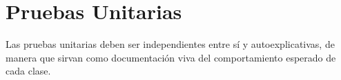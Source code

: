 \section{Pruebas Unitarias}

Las pruebas unitarias deben ser independientes entre sí y autoexplicativas, de manera que sirvan como documentación viva del comportamiento esperado de cada clase.




